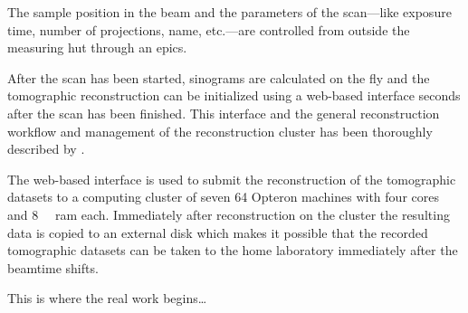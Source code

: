 The sample position in the beam and the parameters of the scan---like exposure time, number of projections, name, etc.---are controlled from outside the measuring hut through an \ac{epics}.

After the scan has been started, sinograms are calculated on the fly and the tomographic reconstruction can be initialized using a web-based interface seconds after the scan has been finished. This interface and the general reconstruction workflow and management of the reconstruction cluster has been thoroughly described by \citet{Hintermueller2010}.

The web-based interface is used to submit the reconstruction of the tomographic datasets to a computing cluster of seven \SI{64}{\bit} Opteron machines with four cores and \SI{8}{\giga\byte} \acs{ram} each. Immediately after reconstruction on the cluster the resulting data is copied to an external disk which makes it possible that the recorded tomographic datasets can be taken to the home laboratory immediately after the beamtime shifts.

This is where the real work begins\ldots